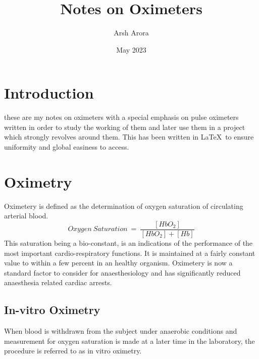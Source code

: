 \documentclass{article}
\title{Notes on Oximeters}
\author{Arsh Arora}
\date{May 2023}
\begin{document}
\maketitle

\section{Introduction}
these are my notes on oximeters with a special emphasis on pulse oximeters written in order to study the working of them and later use them in a project which strongly revolves around them. This has been written in \LaTeX \, to ensure uniformity and global easiness to access.
\section{Oximetry}
Oximetery is defined as the determination of oxygen saturation of circulating arterial blood.
\begin{equation}
    Oxygen\:Saturation\:=\: \frac{[HbO_2]}{[HbO_2] + [Hb]}
\end{equation}
This saturation being a bio-constant, is an indications of the performance of the most important cardio-respiratory functions. It is maintained at a fairly constant value to within a few percent in an healthy organism. Oximetery is now a standard factor to consider for anaesthesiology and has significantly reduced anaesthesia related cardiac arrests. 
\subsection{In-vitro Oximetry}
When blood is withdrawn from the subject under anaerobic conditions and measurement for oxygen saturation is made at a later time in the laboratory, the procedure is referred to as in vitro oximetry.
\end{document}
